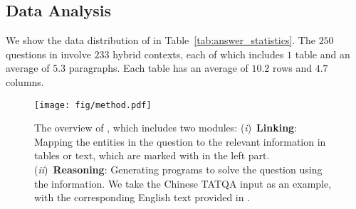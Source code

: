 %     

\subsection{Data Analysis}
We show the data distribution of \ourdataset in Table~\ref{tab:answer_statistics}.
The $250$ questions in \ourdataset involve $233$ hybrid contexts, each of which includes $1$ table and an average of $5.3$ paragraphs. 
Each table has an average of $10.2$ rows and $4.7$ columns.

\begin{figure*}[t]
    \centering
    \texttt{[image: fig/method.pdf]}
    \caption{
    The overview of \ourmethod, which includes two modules:
    (\emph{i})~\textbf{Linking}: Mapping the entities in the question to the relevant information in tables or text, which are marked with  in the left part.
    (\emph{ii})~\textbf{Reasoning}: Generating programs to solve the question using the information.
    We take the Chinese TATQA input as an example, with the corresponding English text provided in \colorbox{gray_light}{}.
    }
    \label{fig:method}
\end{figure*}

